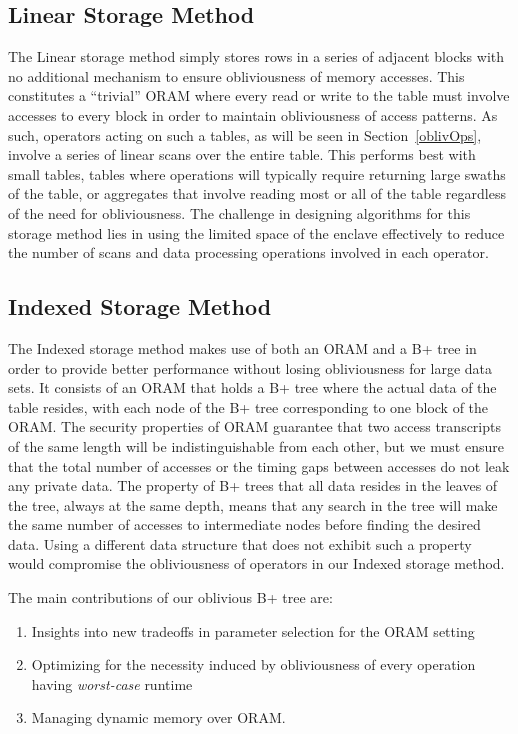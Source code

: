 \documentclass[letterpaper,twocolumn,10pt]{article}
\begin{document}
\subsection{Linear Storage Method}
The Linear storage method simply stores rows in a series of adjacent blocks with no additional mechanism to ensure obliviousness of memory accesses. This constitutes a ``trivial'' ORAM where every read or write to the table must involve accesses to every block in order to maintain obliviousness of access patterns. As such, operators acting on such a tables, as will be seen in Section~\ref{oblivOps}, involve a series of linear scans over the entire table. This performs best with small tables, tables where operations will typically require returning large swaths of the table, or aggregates that involve reading most or all of the table regardless of the need for obliviousness. The challenge in designing algorithms for this storage method lies in using the limited space of the enclave effectively to reduce the number of scans and data processing operations involved in each operator.

\subsection{Indexed Storage Method}
The Indexed storage method makes use of both an ORAM and a B+ tree in order to provide better performance without losing obliviousness for large data sets. It consists of an ORAM that holds a B+ tree where the actual data of the table resides, with each node of the B+ tree corresponding to one block of the ORAM. The security properties of ORAM guarantee that two access transcripts of the same length will be indistinguishable from each other, but we must ensure that the total number of accesses or the timing gaps between accesses do not leak any private data. The property of B+ trees that all data resides in the leaves of the tree, always at the same depth, means that any search in the tree will make the same number of accesses to intermediate nodes before finding the desired data. Using a different data structure that does not exhibit such a property would compromise the obliviousness of operators in our Indexed storage method.

The main contributions of our oblivious B+ tree are:
\begin{enumerate}
\setlength\itemsep{0pt}
\item Insights into new tradeoffs in parameter selection for the ORAM setting
\item Optimizing for the necessity induced by obliviousness of every operation having \emph{worst-case} runtime
\item Managing dynamic memory over ORAM.
\end{enumerate}
\end{document}
